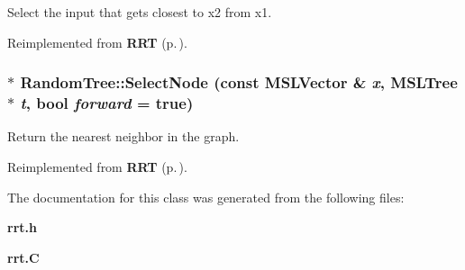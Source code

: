 Select the input that gets closest to x2 from x1.



Reimplemented from {\bf RRT} {\rm (p.\,\pageref{classRRT_b0})}.
\subsubsection{ $\ast$ Random\-Tree::Select\-Node (const {\bf MSLVector} \& {\em x}, {\bf MSLTree} $\ast$ {\em t}, bool {\em forward} = true)\hspace{0.3cm}{\tt  [protected, virtual]}}\label{classRandomTree_b0}


Return the nearest neighbor in the graph.



Reimplemented from {\bf RRT} {\rm (p.\,\pageref{classRRT_b1})}.

The documentation for this class was generated from the following files:\begin{CompactItemize}
\item 
{\bf rrt.h}\item 
{\bf rrt.C}\end{CompactItemize}
